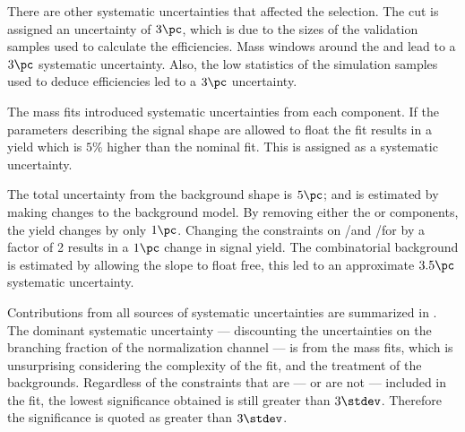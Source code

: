 There are other systematic uncertainties that affected the selection.
The \bdt cut is assigned an uncertainty of $3\pc$, which is due to the sizes of the
validation samples used to calculate the efficiencies.
Mass windows around the \Ds and \phii lead to a $3\pc$ systematic uncertainty.
Also, the low statistics of the simulation samples used to deduce efficiencies led to a $3\pc$
uncertainty.

The mass fits introduced systematic uncertainties from each component.
If the parameters describing the signal shape are allowed to float the fit results in a yield which is
$5\%$ higher than the nominal fit.
This is assigned as a systematic uncertainty.


The total uncertainty from the background shape is $5\pc$; and is estimated by making changes to
the background model.
By removing either the \btodsstrphi or \bstodsstrkstrk components, the yield changes by only $1\pc$.
Changing the constraints on \rA/\rB and \rC/\rD for \bstodskstrk by a factor of 2 results in a
$1\pc$ change in signal yield.
The combinatorial background is estimated by allowing the slope to float free, this led to an
approximate $3.5\pc$ systematic uncertainty.


Contributions from all sources of systematic uncertainties are summarized in .
The dominant systematic uncertainty --- discounting the uncertainties on the branching fraction of
the normalization channel --- is from the mass fits, which is unsurprising considering the
complexity of the fit, and the treatment of the backgrounds.
Regardless of the constraints that are --- or are not --- included in the fit, the lowest
significance obtained is still greater than $3\stdev$.
Therefore the significance is quoted as greater than $3\stdev$.

